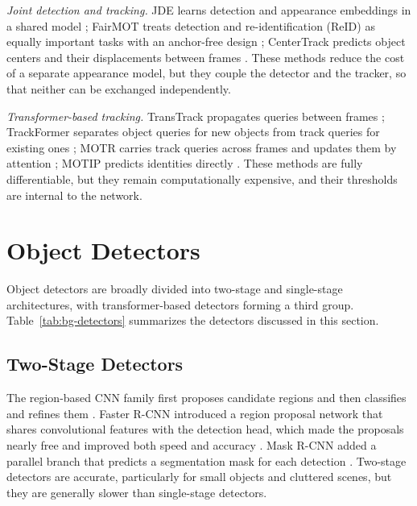 \emph{Joint detection and tracking.} JDE learns detection and appearance embeddings in a shared model \cite{wang2020jde}; FairMOT treats detection and re-identification (ReID) as equally important tasks with an anchor-free design \cite{zhang2021fairmot}; CenterTrack predicts object centers and their displacements between frames \cite{zhou2020centertrack}. These methods reduce the cost of a separate appearance model, but they couple the detector and the tracker, so that neither can be exchanged independently.

\emph{Transformer-based tracking.} TransTrack propagates queries between frames \cite{sun2020transtrack}; TrackFormer separates object queries for new objects from track queries for existing ones \cite{meinhardt2022trackformer}; MOTR carries track queries across frames and updates them by attention \cite{zeng2022motr}; MOTIP predicts identities directly \cite{gao2025motip}. These methods are fully differentiable, but they remain computationally expensive, and their thresholds are internal to the network.

\section{Object Detectors}\label{sec:bg-detectors}
Object detectors are broadly divided into two-stage and single-stage architectures, with transformer-based detectors forming a third group. Table~\ref{tab:bg-detectors} summarizes the detectors discussed in this section.

\subsection{Two-Stage Detectors}
The region-based CNN family first proposes candidate regions and then classifies and refines them \cite{girshick2014rcnn}. Faster R-CNN introduced a region proposal network that shares convolutional features with the detection head, which made the proposals nearly free and improved both speed and accuracy \cite{ren2017fasterrcnn}. Mask R-CNN added a parallel branch that predicts a segmentation mask for each detection \cite{he2017maskrcnn}. Two-stage detectors are accurate, particularly for small objects and cluttered scenes, but they are generally slower than single-stage detectors.

